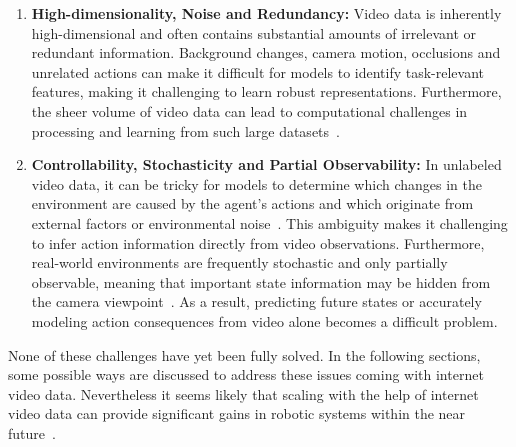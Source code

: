 \begin{enumerate}
	\item \textbf{High-dimensionality, Noise and Redundancy:}
	Video data is inherently high-dimensional and often contains substantial amounts of irrelevant or redundant information. Background changes, camera motion, occlusions and unrelated actions can make it difficult for models to identify task-relevant features, making it challenging to learn robust representations. Furthermore, the sheer volume of video data can lead to computational challenges in processing and learning from such large datasets~\cite{bardes2024vjepa}.

	\item \textbf{Controllability, Stochasticity and Partial Observability:}
	In unlabeled video data, it can be tricky for models to determine which changes in the environment are caused by the agent's actions and which originate from external factors or environmental noise~\cite{Horan2021WhenIU}. This ambiguity makes it challenging to infer action information directly from video observations. Furthermore, real-world environments are frequently stochastic and only partially observable, meaning that important state information may be hidden from the camera viewpoint~\cite{Babaeizadeh2017StochasticVV}. As a result, predicting future states or accurately modeling action consequences from video alone becomes a difficult problem.


\end{enumerate}


None of these challenges have yet been fully solved. In the following sections, some possible ways are discussed to address these issues coming with internet video data. Nevertheless it seems likely that scaling with the help of internet video data can provide significant gains in robotic systems within the near future~\cite{McCarthy_2025}.


